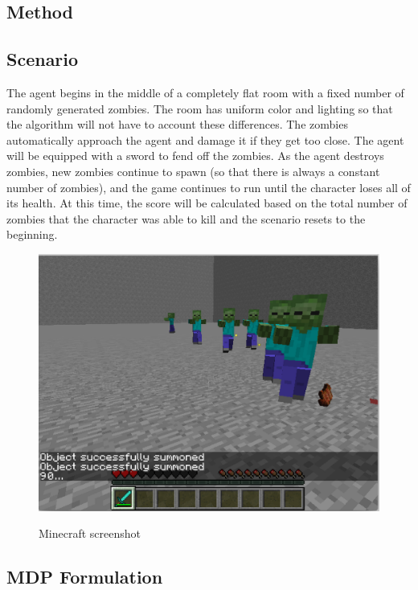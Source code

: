 \documentclass{article}
\begin{document}
\begin{multicols}{2}
\section{Method}



\subsection{Scenario}

The agent begins in the middle of a completely flat room with a fixed number of randomly generated zombies. The room has uniform color and lighting so that the algorithm will not have to account these differences. The zombies automatically approach the agent and damage it if they get too close. The agent will be equipped with a sword to fend off the zombies. As the agent destroys zombies, new zombies continue to spawn (so that there is always a constant number of zombies), and the game continues to run until the character loses all of its health. At this time, the score will be calculated based on the total number of zombies that the character was able to kill and the scenario resets to the beginning.

\begin{figure}[H]
\caption{Minecraft screenshot}
\centering
\includegraphics[scale=0.3]{./hiro_screenshot.png}
\label{fig:screenShot}
\end{figure}

\subsection{MDP Formulation}


\end{multicols}
\end{document}
